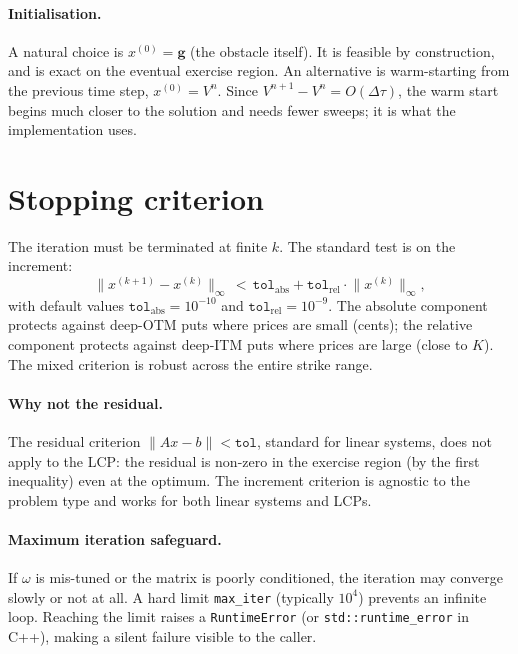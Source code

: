 \documentclass[11pt,a4paper]{article}
\begin{document}
\paragraph{Initialisation.} A natural choice is $x^{(0)} = \mathbf{g}$
(the obstacle itself). It is feasible by construction, and is exact
on the eventual exercise region. An alternative is warm-starting from
the previous time step, $x^{(0)} = V^n$. Since $V^{n+1} - V^n =
O(\Delta\tau)$, the warm start begins much closer to the solution and
needs fewer sweeps; it is what the implementation uses.

\section{Stopping criterion}

The iteration must be terminated at finite $k$. The standard test
is on the increment:
\begin{equation}
\bigl\|x^{(k+1)} - x^{(k)}\bigr\|_\infty
\,<\,
\texttt{tol}_{\mathrm{abs}}
+ \texttt{tol}_{\mathrm{rel}} \cdot \bigl\|x^{(k)}\bigr\|_\infty,
\label{eq:stopping}
\end{equation}
with default values $\texttt{tol}_{\mathrm{abs}} = 10^{-10}$ and
$\texttt{tol}_{\mathrm{rel}} = 10^{-9}$. The absolute component
protects against deep-OTM puts where prices are small (cents); the
relative component protects against deep-ITM puts where prices are
large (close to $K$). The mixed criterion is robust across the entire
strike range.

\paragraph{Why not the residual.} The residual criterion
$\|Ax - b\| < \texttt{tol}$, standard for linear systems, does not
apply to the LCP: the residual is non-zero in the exercise region
(by the first inequality) even at the optimum. The increment
criterion is agnostic to the problem type and works for both linear
systems and LCPs.

\paragraph{Maximum iteration safeguard.} If $\omega$ is mis-tuned or
the matrix is poorly conditioned, the iteration may converge slowly
or not at all. A hard limit \texttt{max\_iter} (typically $10^4$)
prevents an infinite loop. Reaching the limit raises a
\texttt{RuntimeError} (or \texttt{std::runtime\_error} in C++),
making a silent failure visible to the caller.
\end{document}
